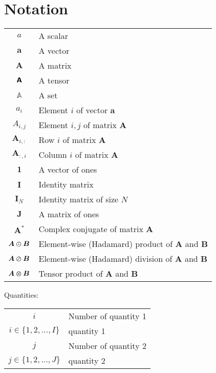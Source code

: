 
\chapter*{Notation}\label{ch:notation}

\begin{center}
    \begin{tabular}{ c l }
        $a$ & A scalar \\
        $\bm{a}$ & A vector \\
        $\bm{A}$ & A matrix \\
        $\textbf{\textsf{A}}$ & A tensor \\
        $\mathbb{A}$ & A set \\

        $a_i$ & Element $i$ of vector $\bm{a}$ \\

        $A_{i, j}$ & Element $i, j$ of matrix $\bm{A}$ \\
        $\bm{A}_{i,:}$ & Row $i$ of matrix $\bm{A}$ \\
        $\bm{A}_{:,i}$ & Column $i$ of matrix $\bm{A}$ \\

        $\bm{1}$ & A vector of ones \\
        $\bm{I}$ & Identity matrix \\
        $\bm{I}_N$ & Identity matrix of size $N$ \\
        $\bm{J}$ & A matrix of ones \\
        $\bm{A}^*$ & Complex conjugate of matrix $\bm{A}$ \\

        $\bm{A} \varodot \bm{B}$ & Element-wise (Hadamard) product of $\bm{A}$ and $\bm{B}$ \\
        $\bm{A} \varoslash \bm{B}$ & Element-wise (Hadamard) division of $\bm{A}$ and $\bm{B}$ \\
        $\bm{A} \varotimes \bm{B}$ & Tensor product of $\bm{A}$ and $\bm{B}$
    \end{tabular}
\end{center}

Quantities:

\begin{center}
    \begin{tabular}{ c l }
        $i$ & Number of quantity 1 \\
        $i \in \{ 1, 2, \ldots, I \}$ & quantity 1 \\
        $j$ & Number of quantity 2 \\
        $j \in \{ 1, 2, \ldots, J \}$ & quantity 2
    \end{tabular}
\end{center}


